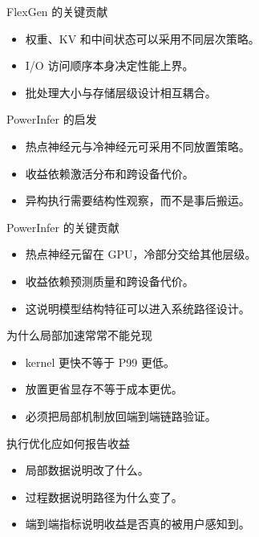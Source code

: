 \begin{frame}{FlexGen 的关键贡献}
  \begin{itemize}
    \item 权重、KV 和中间状态可以采用不同层次策略。
    \item I/O 访问顺序本身决定性能上界。
    \item 批处理大小与存储层级设计相互耦合。
  \end{itemize}
\end{frame}

\begin{frame}{PowerInfer 的启发}
  \begin{itemize}
    \item 热点神经元与冷神经元可采用不同放置策略。
    \item 收益依赖激活分布和跨设备代价。
    \item 异构执行需要结构性观察，而不是事后搬运。
  \end{itemize}
\end{frame}

\begin{frame}{PowerInfer 的关键贡献}
  \begin{itemize}
    \item 热点神经元留在 GPU，冷部分交给其他层级。
    \item 收益依赖预测质量和跨设备代价。
    \item 这说明模型结构特征可以进入系统路径设计。
  \end{itemize}
\end{frame}

\begin{frame}{为什么局部加速常常不能兑现}
  \begin{itemize}
    \item kernel 更快不等于 P99 更低。
    \item 放置更省显存不等于成本更优。
    \item 必须把局部机制放回端到端链路验证。
  \end{itemize}
\end{frame}

\begin{frame}{执行优化应如何报告收益}
  \begin{itemize}
    \item 局部数据说明改了什么。
    \item 过程数据说明路径为什么变了。
    \item 端到端指标说明收益是否真的被用户感知到。
  \end{itemize}
\end{frame}

